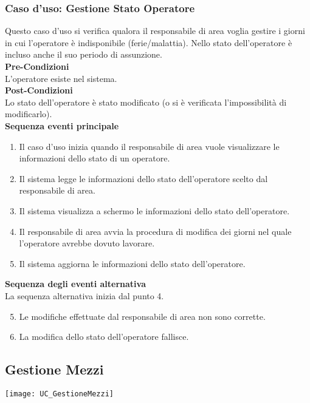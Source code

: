 \documentclass[green, fancy, 11pt]{elegantbook}
\begin{document}
\subsubsection{Caso d'uso: Gestione Stato Operatore}
\noindent
Questo caso d’uso si verifica qualora il responsabile di area voglia gestire i giorni in cui l’operatore è indisponibile (ferie/malattia). Nello stato dell’operatore è incluso anche il suo periodo di assunzione.\\
\textbf{Pre-Condizioni}\\
L'operatore esiste nel sistema.\\
\textbf{Post-Condizioni}\\
Lo stato dell'operatore è stato modificato (o si è verificata l’impossibilità di modificarlo).\\
\textbf{Sequenza eventi principale}
\begin{enumerate}
	\item Il caso d’uso inizia quando il responsabile di area vuole visualizzare le informazioni dello stato di un operatore.
	\item Il sistema legge le informazioni dello stato dell’operatore scelto dal responsabile di area.
	\item Il sistema visualizza a schermo le informazioni dello stato dell’operatore.
	\item Il responsabile di area avvia la procedura di modifica dei giorni nel quale l’operatore avrebbe dovuto lavorare.
	\item Il sistema aggiorna le informazioni dello stato dell’operatore.
\end{enumerate}
\textbf{Sequenza degli eventi alternativa}\\
La sequenza alternativa inizia dal punto 4.
\begin{enumerate}
	\setcounter{enumi}{4}
	\item Le modifiche effettuate dal responsabile di area non sono corrette.
	\item La modifica dello stato dell'operatore fallisce.
\end{enumerate}
\newpage


\subsection{Gestione Mezzi}
\texttt{[image: UC\_GestioneMezzi]}
\end{document}

